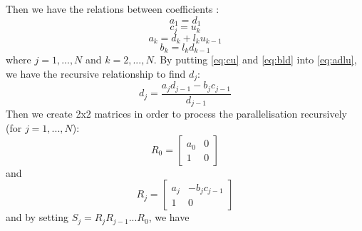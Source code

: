 \documentclass{article}
\begin{document}
                    Then we have the relations between coefficients :
                    \begin{equation}
                        a_{1} = d_{1}
                    \end{equation}
                    \begin{equation}
                        \label{eq:cu}
                        c_{j} = u_{k}
                    \end{equation}
                    \begin{equation}
                        \label{eq:adlu}
                        a_{k} = d_{k} + l_{k}u_{k-1}
                    \end{equation}
                    \begin{equation}
                        \label{eq:bld}
                        b_{k} = l_{k}d_{k-1}
                    \end{equation}
                    where $j = 1,..., N$ and $k=2,...,N$.
                    By putting \ref{eq:cu} and \ref{eq:bld} into \ref{eq:adlu}, we have the recursive
                    relationship to find $d_{j}$:
                    \begin{equation}
                        d_{j} = \frac{a_{j}d_{j-1}-b_{j}c_{j-1}}{d_{j-1}}
                    \end{equation}
                    Then we create 2x2 matrices in order to process the parallelisation recursively (for $j=1,...,N$):
                    \begin{equation}
                        R_{0}=
                        \begin{bmatrix}
                            a_{0} & 0 \\
                            1     & 0
                        \end{bmatrix}
                    \end{equation}
                    and
                    \begin{equation}
                        R_{j}=
                        \begin{bmatrix}
                            a_{j} & -b_{j}c_{j-1} \\
                            1     & 0
                        \end{bmatrix}
                    \end{equation}
                    and by setting $S_{j}=R_{j}R_{j-1}...R_{0}$, we have
\end{document}
